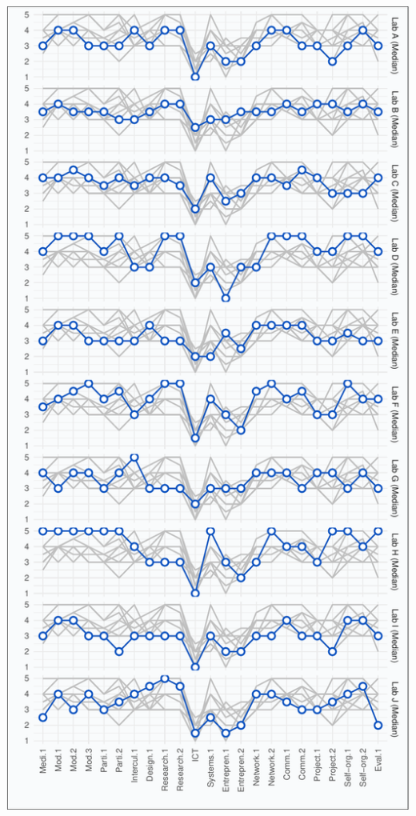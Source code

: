 \documentclass[AMA,STIX1COL,APA,STIX2COL]{WileyNJD-v2}
\begin{document}
\begin{center}\includegraphics[width=0.5\linewidth]{index_files/figure-latex/unnamed-chunk-3-1} \end{center}


\end{document}
